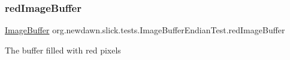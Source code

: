 \subsubsection{\texorpdfstring{red\+Image\+Buffer}{redImageBuffer}}
{\footnotesize\ttfamily \mbox{\hyperlink{classorg_1_1newdawn_1_1slick_1_1_image_buffer}{Image\+Buffer}} org.\+newdawn.\+slick.\+tests.\+Image\+Buffer\+Endian\+Test.\+red\+Image\+Buffer\hspace{0.3cm}{\ttfamily [private]}}

The buffer filled with red pixels 